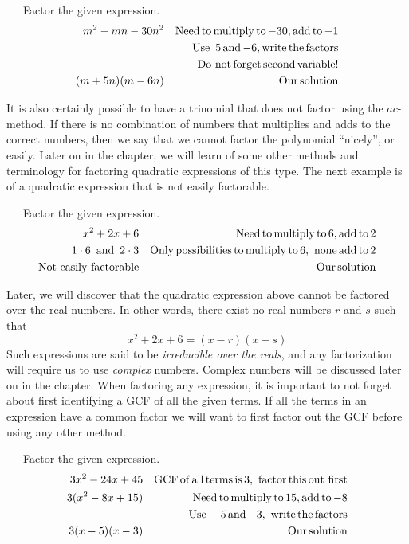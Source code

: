 \begin{example}~~~Factor the given expression.
  \begin{eqnarray*}
    m^2 - m n - 30 n^2 &  & \operatorname{Need} \operatorname{to} \operatorname{multiply} \operatorname{to} -
    30, \operatorname{add} \operatorname{to} - 1\\
    &  & \operatorname{Use~}  5 \operatorname{and} - 6, \operatorname{write} \operatorname{the} \operatorname{factors}\\
		&& \operatorname{Do~not} \operatorname{forget} \operatorname{second} \operatorname{variable!}\\
    (m + 5 n) (m - 6 n) &  & \operatorname{Our} \operatorname{solution}
  \end{eqnarray*}
\end{example}	
It is also certainly possible to have a trinomial that does not factor using the $ac$-method. If there is no
combination of numbers that multiplies and adds to the correct numbers, then
we say that we cannot factor the polynomial ``nicely'', or easily.  Later on in the chapter, we will learn of some other methods and terminology for factoring quadratic expressions of this type.  The next example is of a quadratic expression that is not easily factorable.

\begin{example}~~~Factor the given expression.
  \begin{eqnarray*}
    x^2 + 2 x + 6 &  & \operatorname{Need} \operatorname{to} \operatorname{multiply} \operatorname{to} 6,
    \operatorname{add} \operatorname{to} 2\\
    1 \cdot 6 \operatorname{~and~} 2 \cdot 3 &  & \operatorname{Only} \operatorname{possibilities}
    \operatorname{to} \operatorname{multiply} \operatorname{to} 6, \operatorname{~none} \operatorname{add}
    \operatorname{to} 2\\
    \operatorname{Not~easily~factorable} &  & \operatorname{Our} \operatorname{solution}
  \end{eqnarray*}
\end{example}	
Later, we will discover that the quadratic expression above cannot be factored over the real numbers.  In other words, there exist no real numbers $r$ and $s$ such that
  $$x^2 + 2 x + 6=(x-r)(x-s)$$
Such expressions are said to be \textit{irreducible over the reals}, and any factorization will require us to use \textit{complex} numbers.  Complex numbers will be discussed later on in the chapter.\pp
When factoring any expression, it is important to not forget about first identifying a GCF of all the given terms. If all the terms
in an expression have a common factor we will want to first factor out the GCF before using any other method.

\begin{example}~~~Factor the given expression.
  \begin{eqnarray*}
    3 x^2 - 24 x + 45 &  & \operatorname{GCF} \operatorname{of} \operatorname{all} \operatorname{terms}
    \operatorname{is} 3, \operatorname{~factor} \operatorname{this} \operatorname{out~first}\\
    3 (x^2 - 8 x + 15) &  & \operatorname{Need} \operatorname{to} \operatorname{multiply} \operatorname{to}
    15, \operatorname{add} \operatorname{to} - 8\\
    &  &\operatorname{Use~} - 5 \operatorname{and} - 3, \operatorname{~write} \operatorname{the} \operatorname{factors}\\
    3 (x - 5) (x - 3) &  & \operatorname{Our} \operatorname{solution}
  \end{eqnarray*}
\end{example}	
  
